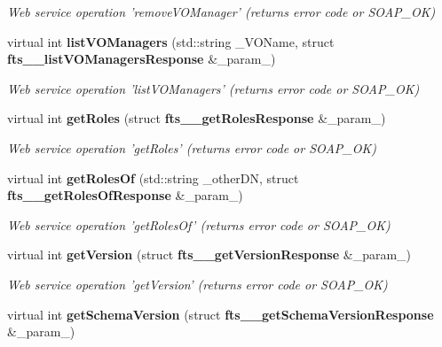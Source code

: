\begin{DoxyCompactItemize}
\begin{DoxyCompactList}\small\item\em Web service operation 'removeVOManager' (returns error code or SOAP\_\-OK) \item\end{DoxyCompactList}\item 
virtual int {\bf listVOManagers} (std::string \_\-VOName, struct {\bf fts\_\-\_\-listVOManagersResponse} \&\_\-param\_)\label{classFileTransferSoapBindingProxy_a5c6683c30a32616c46b49303851b028d}

\begin{DoxyCompactList}\small\item\em Web service operation 'listVOManagers' (returns error code or SOAP\_\-OK) \item\end{DoxyCompactList}\item 
virtual int {\bf getRoles} (struct {\bf fts\_\-\_\-getRolesResponse} \&\_\-param\_)\label{classFileTransferSoapBindingProxy_ac39183a184455f326939688b1ff445f3}

\begin{DoxyCompactList}\small\item\em Web service operation 'getRoles' (returns error code or SOAP\_\-OK) \item\end{DoxyCompactList}\item 
virtual int {\bf getRolesOf} (std::string \_\-otherDN, struct {\bf fts\_\-\_\-getRolesOfResponse} \&\_\-param\_)\label{classFileTransferSoapBindingProxy_aa4bff78d816b24abbb3943f7fd63aedb}

\begin{DoxyCompactList}\small\item\em Web service operation 'getRolesOf' (returns error code or SOAP\_\-OK) \item\end{DoxyCompactList}\item 
virtual int {\bf getVersion} (struct {\bf fts\_\-\_\-getVersionResponse} \&\_\-param\_)\label{classFileTransferSoapBindingProxy_a65bb2750440172f55c588b2f8fdaa6dd}

\begin{DoxyCompactList}\small\item\em Web service operation 'getVersion' (returns error code or SOAP\_\-OK) \item\end{DoxyCompactList}\item 
virtual int {\bf getSchemaVersion} (struct {\bf fts\_\-\_\-getSchemaVersionResponse} \&\_\-param\_)\label{classFileTransferSoapBindingProxy_a4e49bc9bc0d5fa5f6b8e01d764e8a093}


\end{DoxyCompactItemize}
